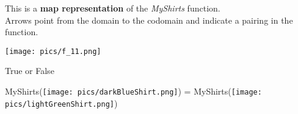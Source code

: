 \documentclass{ximera}
\author{Lee Wayand}
\begin{document}
\begin{exercise}





This is a \textbf{map representation} of the \textit{MyShirts} function. \\

Arrows point from the domain to the codomain and indicate a pairing in the function.

\begin{image}
\texttt{[image: pics/f\_11.png]}
\end{image}















\begin{question}

True or False

\begin{center}
\Huge{MyShirts(\texttt{[image: pics/darkBlueShirt.png]}) = MyShirts(\texttt{[image: pics/lightGreenShirt.png]})}
\end{center}






\begin{multipleChoice}
\end{multipleChoice}

\end{question}



















\end{exercise}
\end{document}
